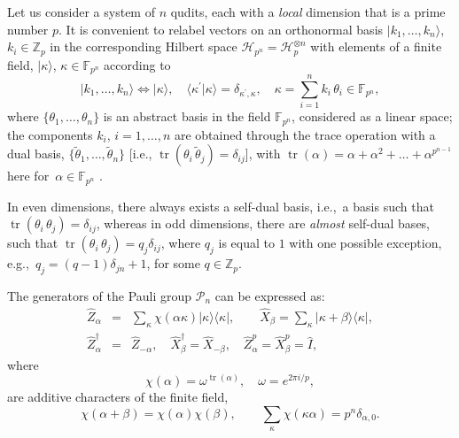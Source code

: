 \documentclass[quantumrep,article,accept,pdftex,moreauthors]{Definitions/mdpi}
\DeclareMathOperator{\tr}{tr}
\begin{document}
Let us consider a system of $n$ qudits, each with a \textit{local} dimension
that is a prime number $p$. It is convenient to relabel vectors on an
orthonormal basis $|k_{1},\ldots,k_{n}\rangle$, $k_{i} \in \mathbb{Z}_{p}$ in
the corresponding Hilbert space $\mathcal{H}_{p^{n}}=\mathcal{H}_{p}^{\otimes
n}$ with elements of a finite field, $|\kappa\rangle$, $\kappa \in
\mathbb{F}_{p^{n}}$ according to
\begin{equation}
  |k_{1},\ldots,k_{n}\rangle
  \Leftrightarrow |\kappa\rangle,
  \quad \langle\kappa^{\prime}|\kappa\rangle
  = \delta_{\kappa^{\prime},\kappa},
  \quad \kappa
  = \sum_{i=1}^{n} k_{i} \, \theta_{i} \in \mathbb{F}_{p^{n}},
  \label{basis}
\end{equation}
where $\{\theta_{1},\ldots,\theta_{n}\}$ is an abstract basis in the field
$\mathbb{F}_{p^{n}}$, considered as a linear space; the components $k_{i}$,
$i=1,\ldots,n$ are obtained through the trace operation with a dual basis,
$\{\tilde{\theta}_{1},\ldots,\tilde{\theta}_{n}\}$ [i.e.,
$\tr(\theta_{i}\,\tilde{\theta}_{j})=\delta_{ij}$], with  $\tr(\alpha)=\alpha
+\alpha^{2}+\ldots+\alpha^{p^{n-1}}$ here for~$\alpha \in \mathbb{F}_{p^{n}}$
\cite{FF}.

In even dimensions, there always exists a self-dual basis, i.e.,~a basis such that
$\tr(\theta_{i}\,\theta_{j})=\delta_{ij}$, whereas in odd dimensions, there are
\textit{almost} self-dual bases, such that
$\tr(\theta_{i}\,\theta_{j})=q_{j}\delta_{ij}$, where $q_{j}$ is equal to $1$
with one possible exception, e.g.,~$q_{j}=(q-1)\delta_{jn}+1$, for some $q \in
\mathbb{Z}_p$.

The generators of the Pauli group $\mathcal{P}_{n}$ can be expressed as:
\begin{eqnarray}
  \hat{Z}_{\alpha}
  &=& \sum_{\kappa} \chi\left( \alpha\kappa \right)
  |\kappa\rangle \langle\kappa|,
  \qquad \hat{X}_{\beta}
  = \sum_{\kappa} |\kappa + \beta\rangle \langle\kappa|,
  \label{XZ} \\
  \hat{Z}_{\alpha }^{\dagger}
  &=& \hat{Z}_{-\alpha}, \quad \hat{X}_{\beta }^{\dagger}
  = \hat{X}_{-\beta}, \quad \hat{Z}_{\alpha}^{p}
  = \hat{X}_{\beta}^{p} = \hat{I},
\end{eqnarray}
where
\begin{equation*}
  \chi \left( \alpha \right)
  = \omega^{\tr\left( \alpha \right)},
  \quad \omega = e^{2\pi i / p},
\end{equation*}
are additive characters of the finite field,
\begin{equation*}
  \chi\left( \alpha+\beta \right)
  = \chi\left( \alpha \right) \chi\left( \beta \right),
  \qquad \sum_{\kappa }\chi\left( \kappa\alpha \right)
  = p^{n}\delta_{\alpha,0}.
\end{equation*}
\end{document}
